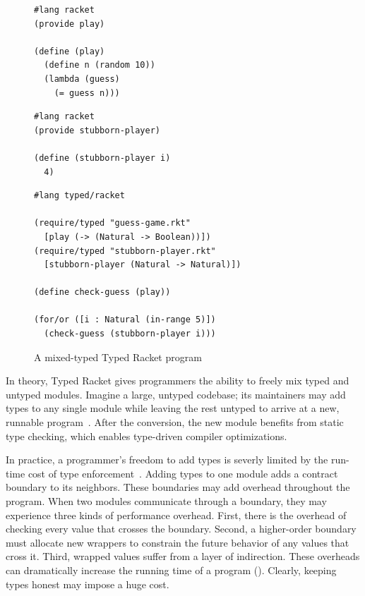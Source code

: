 \begin{figure}[h]
  \begin{minipage}[t]{0.45\columnwidth}
    \begin{lstlisting}
#lang racket
(provide play)

(define (play)
  (define n (random 10))
  (lambda (guess)
    (= guess n)))
    \end{lstlisting}

  \end{minipage}\begin{minipage}[t]{0.45\columnwidth}
    \begin{lstlisting}
#lang racket
(provide stubborn-player)

(define (stubborn-player i)
  4)
    \end{lstlisting}

  \end{minipage}

  \smallskip
  \begin{centering}
    \begin{minipage}{0.6\columnwidth}
      \begin{lstlisting}
#lang typed/racket

(require/typed "guess-game.rkt"
  [play (-> (Natural -> Boolean))])
(require/typed "stubborn-player.rkt"
  [stubborn-player (Natural -> Natural)])

(define check-guess (play))

(for/or ([i : Natural (in-range 5)])
  (check-guess (stubborn-player i)))
      \end{lstlisting}
    \end{minipage}
  \end{centering}

  \caption{A mixed-typed Typed Racket program~\cite{gtnffvf-jfp-2019}}
  \label{fig:guess-game}
\end{figure}

In theory, Typed Racket gives programmers the ability to freely mix typed and untyped modules.
Imagine a large, untyped codebase;
 its maintainers may add types to any single module while leaving the rest
 untyped to arrive at a new, runnable program~\cite{tf-dls-2006,tf-popl-2008}.
After the conversion, the new module benefits from static type checking,
 which enables type-driven compiler optimizations.

In practice, a programmer's freedom to add types is severly limited by
 the run-time cost of type enforcement~\cite{tfgnvf-popl-2016,gtnffvf-jfp-2019}.
Adding types to one module adds a contract boundary to its neighbors.
These boundaries may add overhead throughout the program.
When two modules communicate through a boundary, they may experience three kinds
 of performance overhead.
First, there is the overhead of checking every value that crosses the
 boundary.
Second, a higher-order boundary must allocate new wrappers to constrain the
 future behavior of any values that cross it.
Third, wrapped values suffer from a layer of indirection.
These overheads can dramatically increase the running time of a program
 ().
Clearly, keeping types honest may impose a huge cost.


